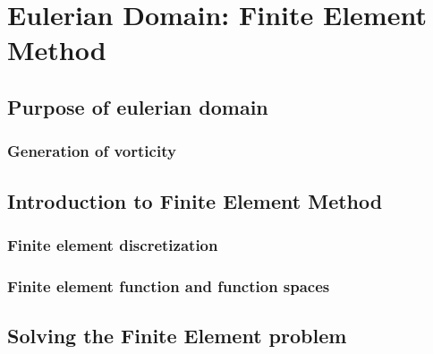 \chapter{Eulerian Domain: Finite Element Method}

\section{Purpose of eulerian domain}

\subsection{Generation of vorticity}


\section{Introduction to Finite Element Method}


\subsection{Finite element discretization}


\subsection{Finite element function and function spaces}


\section{Solving the Finite Element problem}

